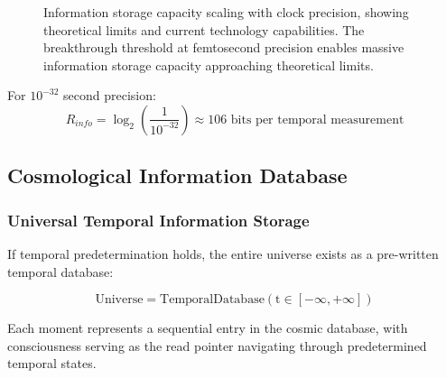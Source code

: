 \documentclass[12pt,a4paper]{article}
\begin{document}
{{{{{{{{{{{{{{\begin{figure}[H]
\caption{Information storage capacity scaling with clock precision, showing theoretical limits and current technology capabilities. The breakthrough threshold at femtosecond precision enables massive information storage capacity approaching theoretical limits.}
\label{fig:clock_precision_capacity}
\end{figure}

For $10^{-32}$ second precision:
$$R_{info} = \log_2\left(\frac{1}{10^{-32}}\right) \approx 106 \text{ bits per temporal measurement}$$

\subsection{Cosmological Information Database}

\subsubsection{Universal Temporal Information Storage}

If temporal predetermination holds, the entire universe exists as a pre-written temporal database:

\begin{equation}
\text{Universe} = \text{TemporalDatabase}(\text{t} \in [-\infty, +\infty])
\end{equation}

Each moment represents a sequential entry in the cosmic database, with consciousness serving as the read pointer navigating through predetermined temporal states.

}}}}}}}}}}}}}}
\end{document}
